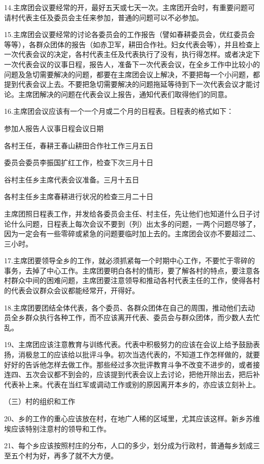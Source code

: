 14.主席团会议要经常的开，最好五天或七天一次。主席团开会时，有重要问题可请村代表主任及委员会主任来参加，普通的问题可以不必参加。

15.主席团会议要经常的讨论各委员会的工作报告（譬如春耕委员会，优红委员会等等），各群众团体的报告（如赤卫军，耕田合作社。妇女代表会等），并且检查上一次代表会议的决定，各村代表主任及代表执行了没有，执行得怎样。或者决定下一次代表会议的议事日程，报告人，准备下一次代表会议，在全乡工作中比较小的问题及急切需要解决的问题，都要在主席团会议上解决，不要把每一个小问题，都提到代表会议上去。不要把急切需要解决的问题拖延等待到下一次代表会议才能讨论。主席团解决的问题在代表会议上报告，通知代表们取得他们的同意。

16.主席团会议应该有一个一个月或二个月的日程表。日程表的格式如下：

参加人报告人议事日程会议日期

各村王任，春耕王春山耕田合作社工作三月五日

委员会委员李振国扩红工作，检查下次三月十日

谷村主任乡主席代表会议准备。三月十五日

各村主任乡主席春耕进行状况的检查三月二十日

主席团照日程表工作，并发给各委员会主任、村主任，先让他们也知道什么日子讨论什么问题，日程表上每次会议不要到（列）出太多的问题，一两个问题尽够了，因为一定会有一些零碎或紧急的问题要临时加上去的。主席团会议亦不要超过二、三小时。

17.主席团要领导全乡的工作，就必须抓紧每一个时期中心工作，不要忙于零碎的事务，去掉了中心工作。主席团要明白各村的情形，要了解各村的特点，要注意各村群众中间的困难问题，主席团要注意领导和推动各村代表主任的工作，使得各村的代表会议群众会议都能经常开，开得好。

18.主席团要团结全体代表，各个委员、各群众团体在自己的周围，推动他们去动员全乡群众执行各种工作，而不应该离开代表、委员会与群众团体，而少数人去忙乱。

19、主席团应该注意教育与训练代表。代表中积极努力的应该在会议上给予鼓励表扬，消极怠工的应该给以批评斗争。初次当选代表的，不知道工作怎样做的，就要好好的告诉他怎样去做工作。那些经过多次批评教育斗争不改变不进步的，或者接连四、五次会议都不到会的，应该提到代表会议上去讨论，把他开除出去，把后补代表补上来。代表在当红军或调动工作或别的原因离开本乡的，亦应该立刻补上。

（三）村的组织和工作

20、乡的工作的重心应该放在村，在地广人稀的区域里，尤其应该这样。新乡苏维埃应该特别注意村的领导和工作。

21、每个乡应该按照村庄的分布，人口的多少，划分成为行政村，普通每乡划成三至五个村为好，再多了就不大方便。


